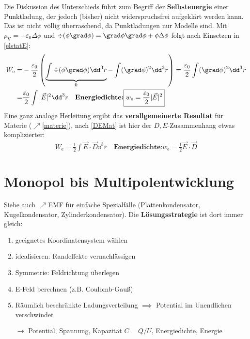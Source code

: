 			   Die Diskussion des Unterschieds führt zum Begriff der
			        \textbf{Selbstenergie} einer Punktladung, der jedoch (bisher) nicht
			        widerspruchsfrei aufgeklärt werden kann. Das ist nicht völlig
			        überraschend, da Punktladungen nur Modelle sind.
			   Mit $\rho_\text{V}=-\varepsilon_0\Delta \phi$ und
			        $\div (\phi\grad \phi) = \grad \phi\grad \phi + \phi\Delta \phi$
			        folgt nach Einsetzen in \ref{elstatE}:
			        \begin{equation}\begin{split}
					        W_\text{e} = & -\frac{\varepsilon_0}{2}\left(\underbrace{\int \div (\phi\grad \phi)
					        \dd^3 r}_0 - \int (\grad \phi)^2 \dd^3 r\right)  =
					        \frac{\varepsilon_0}{2} \int (\grad \phi)^2 \dd^3 r\\
					        = & \frac{\varepsilon_0}{2} \int |\vec{E}|^2 \dd^3 r
					        \quad\textbf{Energiedichte:} \boxed{w_\text{e} = \frac{\varepsilon_0}{2} |\vec{E}|^2}
				        \end{split}\end{equation}
			        	Eine ganz analoge Herleitung ergibt das \textbf{verallgemeinerte Resultat} für Materie ($\nearrow$\ref{materie}), nach \ref{DEMat} ist hier der $D,E$-Zusammenhang etwas komplizierter:
			        	\begin{equation}\label{edichteE}\begin{split}
			        			\boxed{W_\text{e} = \frac{1}{2}\int \vec{E}\cdot\vec{D} \dd^3 r}
			        			\quad\textbf{Energiedichte:} \boxed{w_\text{e} = \frac{1}{2} \vec{E}\cdot\vec{D}}
			        	\end{split}\end{equation}
 \section{Monopol bis Multipolentwicklung}
  Siehe auch $\nearrow$EMF für einfache Spezialfälle (Plattenkondensator, Kugelkondensator, Zylinderkondensator).
	  Die \textbf{Lösungsstrategie} ist dort immer gleich:
	        \begin{enumerate}
		        \item geeignetes Koordinatensystem wählen
		        \item idealisieren: Randeffekte vernachlässigen
		        \item Symmetrie: Feldrichtung überlegen
		        \item E-Feld berechnen (z.B. Coulomb-Gauß)
		        \item Räumlich beschränkte Ladungsverteilung $\implies$ Potential
		              im Unendlichen verschwindet
		        \item[$\to$] Potential, Spannung, Kapazität $C = Q/U$,
		              Energiedichte, Energie
	        \end{enumerate}
